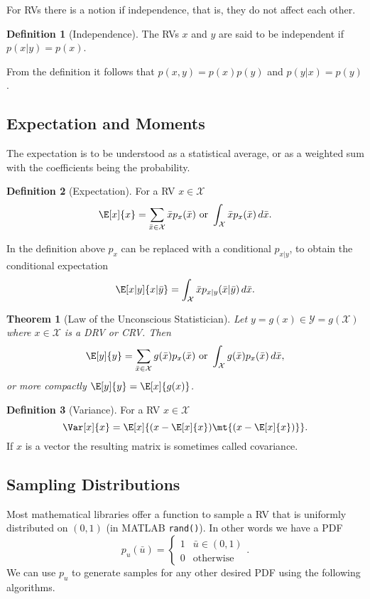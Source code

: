 \documentclass[margin=small]{hsrzf}
\theoremstyle{plain}
\newtheorem{thm}{Theorem}[section]
\theoremstyle{definition}
\newtheorem{defn}{Definition}[section]
\theoremstyle{remark}
\begin{document}
For RVs there is a notion if independence, that is, they do not affect each
other.

\begin{defn}[Independence]
  The RVs $x$ and $y$ are said to be independent if $p(x|y) = p(x)$.
\end{defn}

From the definition it follows that $p(x,y) = p(x)p(y)$ and $p(y|x) = p(y)$.

\subsection{Expectation and Moments}

The expectation is to be understood as a statistical average, or as a weighted
sum with the coefficients being the probability.

\begin{defn}[Expectation]
  For a RV $x \in \mathcal{X}$
  \[
    \E[x]{x}
       = \sum_{\bar{x} \in \mathcal{X}} \bar{x} p_x(\bar{x})
       \text{ or }
       \int_\mathcal{X} \bar{x} p_x(\bar{x}) \, d\bar{x}.
  \]
\end{defn}

In the definition above $p_x$ can be replaced with a conditional $p_{x|y}$, to
obtain the conditional expectation
\[
  \E[x|y]{x | \bar{y}} 
    = \int_\mathcal{X} \bar{x} p_{x|y}(\bar{x} | \bar{y}) \, d\bar{x}.
\]

\begin{thm}[Law of the Unconscious Statistician]
  Let $y = g(x) \in \mathcal{Y} = g(\mathcal{X})$ where $x \in \mathcal{X}$ is
  a DRV or CRV. Then
  \[
    \E[y]{y} = \sum_{\bar{x} \in \mathcal{X}} g(\bar{x}) p_x(\bar{x})
      \text{ or }
      \int_\mathcal{X} g(\bar{x}) p_x(\bar{x}) \, d\bar{x},
  \]
  or more compactly $\E[y]{y} = \E[x]{g(x)}$.
\end{thm}

\begin{defn}[Variance]
  For a RV $x \in \mathcal{X}$
  \[
    \Var[x]{x} = \E[x]{(x - \E[x]{x})\mt{(x - \E[x]{x})}}.
  \]
  If $x$ is a vector the resulting matrix is sometimes called covariance.
\end{defn}

\subsection{Sampling Distributions}

Most mathematical libraries offer a function to sample a RV that is uniformly
distributed on $(0,1)$ (in MATLAB \texttt{rand()}). In other words we have a
PDF
\[
  p_u(\bar{u}) = \begin{cases}
    1 & \bar{u} \in (0,1) \\
    0 & \text{otherwise}
  \end{cases}.
\]
We can use $p_u$ to generate samples for any other desired PDF using the
following algorithms.
\end{document}
